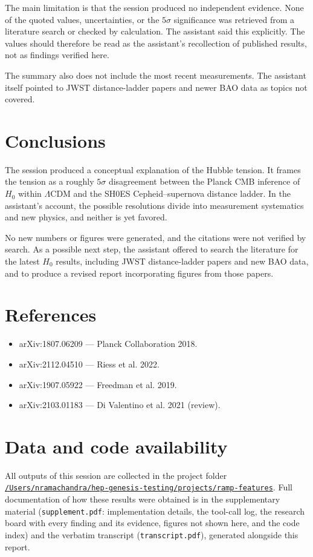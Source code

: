 \documentclass[11pt,a4paper]{article}
\begin{document}
The main limitation is that the session produced no independent evidence. None of the quoted values, uncertainties, or the $5\sigma$ significance was retrieved from a literature search or checked by calculation. The assistant said this explicitly. The values should therefore be read as the assistant's recollection of published results, not as findings verified here.

The summary also does not include the most recent measurements. The assistant itself pointed to JWST distance-ladder papers and newer BAO data as topics not covered.

\section{Conclusions}
The session produced a conceptual explanation of the Hubble tension. It frames the tension as a roughly $5\sigma$ disagreement between the Planck CMB inference of $H_0$ within $\Lambda$CDM and the SH0ES Cepheid--supernova distance ladder. In the assistant's account, the possible resolutions divide into measurement systematics and new physics, and neither is yet favored.

No new numbers or figures were generated, and the citations were not verified by search. As a possible next step, the assistant offered to search the literature for the latest $H_0$ results, including JWST distance-ladder papers and new BAO data, and to produce a revised report incorporating figures from those papers.

\section*{References}
\begin{itemize}
\item arXiv:1807.06209 --- Planck Collaboration 2018.
\item arXiv:2112.04510 --- Riess et al. 2022.
\item arXiv:1907.05922 --- Freedman et al. 2019.
\item arXiv:2103.01183 --- Di Valentino et al. 2021 (review).
\end{itemize}

\section*{Data and code availability}
All outputs of this session are collected in the project folder \href{file:///Users/nramachandra/hep-genesis-testing/projects/ramp-features}{\texttt{/\allowbreak{}Users/\allowbreak{}nramachandra/\allowbreak{}hep-genesis-testing/\allowbreak{}projects/\allowbreak{}ramp-features}}.
Full documentation of how these results were obtained is in the supplementary material (\texttt{supplement.pdf}: implementation details, the tool-call log, the research board with every finding and its evidence, figures not shown here, and the code index) and the verbatim transcript (\texttt{transcript.pdf}), generated alongside this report.
\end{document}
